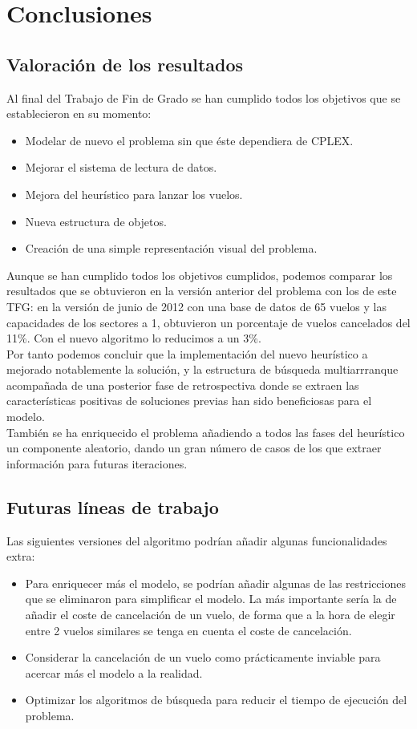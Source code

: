 \chapter{Conclusiones}
\label{conclusiones}
\section{Valoración de los resultados}
Al final del Trabajo de Fin de Grado se han cumplido todos los objetivos que se establecieron en su momento:
\begin{itemize}
	\item Modelar de nuevo el problema sin que éste dependiera de CPLEX.
	\item Mejorar el sistema de lectura de datos.
	\item Mejora del heurístico para lanzar los vuelos.
	\item Nueva estructura de objetos.
	\item Creación de una simple representación visual del problema.
\end{itemize}
Aunque se han cumplido todos los objetivos cumplidos, podemos comparar los resultados que se obtuvieron en la versión anterior del problema con los de este TFG: en la versión de junio de 2012 con una base de datos de 65 vuelos y las capacidades de los sectores a 1, obtuvieron un porcentaje de vuelos cancelados del 11\%. Con el nuevo algoritmo lo reducimos a un 3\%.\\
Por tanto podemos concluir que la implementación del nuevo heurístico a mejorado notablemente la solución, y la estructura de búsqueda multiarrranque acompañada de una posterior fase de retrospectiva donde se extraen las características positivas de soluciones previas han sido beneficiosas para el modelo.\\
También se ha enriquecido el problema añadiendo a todos las fases del heurístico un componente aleatorio, dando un gran número de casos de los que extraer información para futuras iteraciones.
\section{Futuras líneas de trabajo}
Las siguientes versiones del algoritmo podrían añadir algunas funcionalidades extra:
\begin{itemize}
	\item Para enriquecer más el modelo, se podrían añadir algunas de las restricciones que se eliminaron para simplificar el modelo. La más importante sería la de añadir el coste de cancelación de un vuelo, de forma que a la hora de elegir entre 2 vuelos similares se tenga en cuenta el coste de cancelación.
	\item Considerar la cancelación de un vuelo como prácticamente inviable para acercar más el modelo a la realidad.
	\item Optimizar los algoritmos de búsqueda para reducir el tiempo de ejecución del problema.
\end{itemize}


